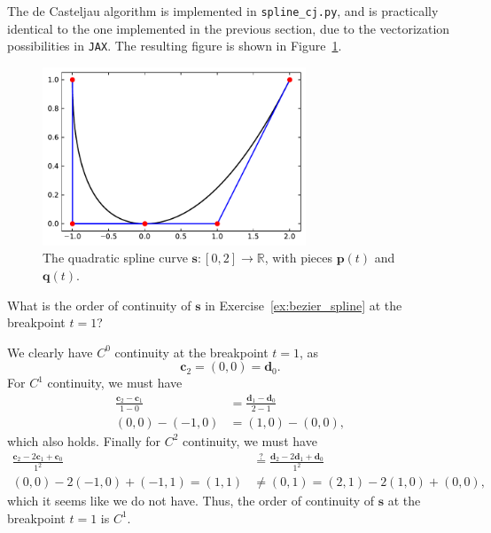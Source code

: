 \begin{solution}
    The de Casteljau algorithm is implemented in \verb|spline_cj.py|, and is practically identical to the one implemented in the previous section, due to the vectorization possibilities in \verb|JAX|.
    The resulting figure is shown in Figure~\ref{fig:bezier_spline}.
    \begin{figure}[ht]
        \centering
        \includegraphics[width=0.7\textwidth]{2_splines_in_bb/bezier_casteljau.pdf}
        \caption{The quadratic spline curve $\mathbf{s} : [0, 2] \to \mathbb{R}$, with pieces $\mathbf{p}(t)$ and $\mathbf{q}(t)$.\label{fig:bezier_spline}}
    \end{figure}
\end{solution}

\begin{exercise}
    What is the order of continuity of $\mathbf{s}$ in Exercise~\ref{ex:bezier_spline} at the breakpoint $t = 1$?
\end{exercise}

\begin{solution}
    We clearly have $C^0$ continuity at the breakpoint $t = 1$, as
    \begin{equation*}
        \mathbf{c}_2 = (0, 0) = \mathbf{d}_0.
    \end{equation*}
    For $C^1$ continuity, we must have
    \begin{align*}
        \frac{\mathbf{c}_2 - \mathbf{c}_1}{1 - 0} &= \frac{\mathbf{d}_1 - \mathbf{d}_0}{2 - 1} \\
        (0, 0) - (-1, 0) &= (1, 0) - (0, 0),
    \end{align*}
    which also holds.
    Finally for $C^2$ continuity, we must have
    \begin{align*}
        \frac{\mathbf{c}_2 - 2 \mathbf{c}_1 + \mathbf{c}_0}{1^2} &\stackrel{?}{=} \frac{\mathbf{d}_2 - 2 \mathbf{d}_1 + \mathbf{d}_0}{1^2} \\
        (0, 0) - 2(-1, 0) + (-1, 1) = (1, 1) &\neq (0, 1) = (2, 1) - 2(1, 0) + (0, 0),
    \end{align*}
    which it seems like we do not have.
    Thus, the order of continuity of $\mathbf{s}$ at the breakpoint $t = 1$ is $C^1$.
\end{solution}

